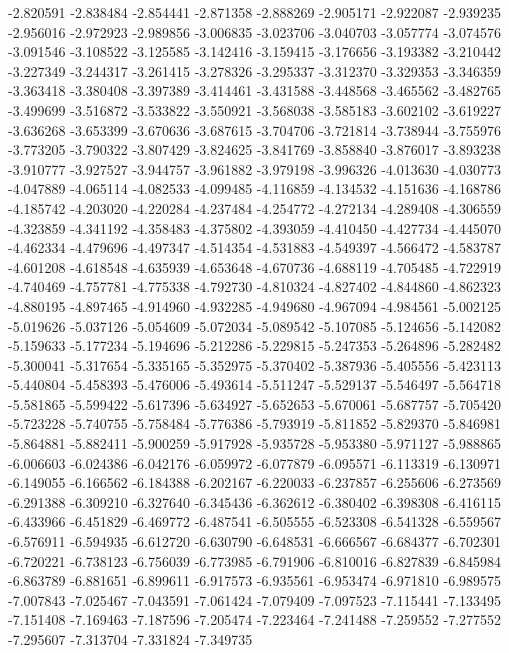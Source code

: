 -2.820591
-2.838484
-2.854441
-2.871358
-2.888269
-2.905171
-2.922087
-2.939235
-2.956016
-2.972923
-2.989856
-3.006835
-3.023706
-3.040703
-3.057774
-3.074576
-3.091546
-3.108522
-3.125585
-3.142416
-3.159415
-3.176656
-3.193382
-3.210442
-3.227349
-3.244317
-3.261415
-3.278326
-3.295337
-3.312370
-3.329353
-3.346359
-3.363418
-3.380408
-3.397389
-3.414461
-3.431588
-3.448568
-3.465562
-3.482765
-3.499699
-3.516872
-3.533822
-3.550921
-3.568038
-3.585183
-3.602102
-3.619227
-3.636268
-3.653399
-3.670636
-3.687615
-3.704706
-3.721814
-3.738944
-3.755976
-3.773205
-3.790322
-3.807429
-3.824625
-3.841769
-3.858840
-3.876017
-3.893238
-3.910777
-3.927527
-3.944757
-3.961882
-3.979198
-3.996326
-4.013630
-4.030773
-4.047889
-4.065114
-4.082533
-4.099485
-4.116859
-4.134532
-4.151636
-4.168786
-4.185742
-4.203020
-4.220284
-4.237484
-4.254772
-4.272134
-4.289408
-4.306559
-4.323859
-4.341192
-4.358483
-4.375802
-4.393059
-4.410450
-4.427734
-4.445070
-4.462334
-4.479696
-4.497347
-4.514354
-4.531883
-4.549397
-4.566472
-4.583787
-4.601208
-4.618548
-4.635939
-4.653648
-4.670736
-4.688119
-4.705485
-4.722919
-4.740469
-4.757781
-4.775338
-4.792730
-4.810324
-4.827402
-4.844860
-4.862323
-4.880195
-4.897465
-4.914960
-4.932285
-4.949680
-4.967094
-4.984561
-5.002125
-5.019626
-5.037126
-5.054609
-5.072034
-5.089542
-5.107085
-5.124656
-5.142082
-5.159633
-5.177234
-5.194696
-5.212286
-5.229815
-5.247353
-5.264896
-5.282482
-5.300041
-5.317654
-5.335165
-5.352975
-5.370402
-5.387936
-5.405556
-5.423113
-5.440804
-5.458393
-5.476006
-5.493614
-5.511247
-5.529137
-5.546497
-5.564718
-5.581865
-5.599422
-5.617396
-5.634927
-5.652653
-5.670061
-5.687757
-5.705420
-5.723228
-5.740755
-5.758484
-5.776386
-5.793919
-5.811852
-5.829370
-5.846981
-5.864881
-5.882411
-5.900259
-5.917928
-5.935728
-5.953380
-5.971127
-5.988865
-6.006603
-6.024386
-6.042176
-6.059972
-6.077879
-6.095571
-6.113319
-6.130971
-6.149055
-6.166562
-6.184388
-6.202167
-6.220033
-6.237857
-6.255606
-6.273569
-6.291388
-6.309210
-6.327640
-6.345436
-6.362612
-6.380402
-6.398308
-6.416115
-6.433966
-6.451829
-6.469772
-6.487541
-6.505555
-6.523308
-6.541328
-6.559567
-6.576911
-6.594935
-6.612720
-6.630790
-6.648531
-6.666567
-6.684377
-6.702301
-6.720221
-6.738123
-6.756039
-6.773985
-6.791906
-6.810016
-6.827839
-6.845984
-6.863789
-6.881651
-6.899611
-6.917573
-6.935561
-6.953474
-6.971810
-6.989575
-7.007843
-7.025467
-7.043591
-7.061424
-7.079409
-7.097523
-7.115441
-7.133495
-7.151408
-7.169463
-7.187596
-7.205474
-7.223464
-7.241488
-7.259552
-7.277552
-7.295607
-7.313704
-7.331824
-7.349735
